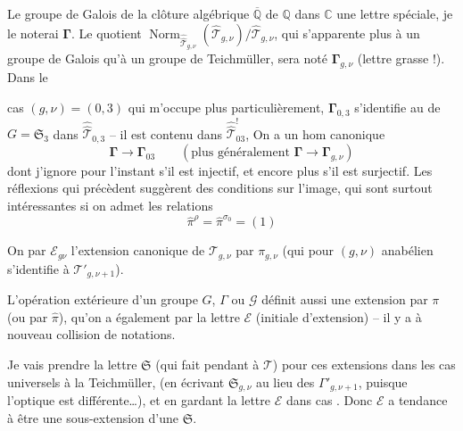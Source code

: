 Le groupe de Galois  de la clôture algébrique $\overline{\mathbb Q}$ de $\mathbb Q$ dans $\mathbb C$   une lettre spéciale, je le noterai $\boldsymbol{\Gamma}$. Le quotient  $\operatorname{Norm}_{\widehat{\widehat{\mathcal T}}_{g,\nu}}(\widehat{\mathcal T}_{g,\nu})/\widehat{\mathcal T}_{g,\nu}$, qui s'apparente plus à un groupe de Galois qu'à un groupe de Teichmüller, sera noté $\boldsymbol{\Gamma}_{g,\nu}$ (lettre grasse !). Dans le



cas $(g,\nu)=(0,3)$ qui m'occupe plus particulièrement, $\boldsymbol{\Gamma}_{0,3}$ s'identifie au   de $G=\mathfrak S_3$  dans $\widehat{\widehat{\mathcal T}}_{0,3}$ -- il est contenu dans $\widehat{\widehat{\mathcal T}}_{03}^{!}$,  On a un hom canonique
\[
\boldsymbol{\Gamma}\longrightarrow\boldsymbol{\Gamma}_{03}
\qquad (\text{plus généralement }\boldsymbol{\Gamma}\longrightarrow\boldsymbol{\Gamma}_{g,\nu})
\]
dont j'ignore pour l'instant s'il est injectif, et encore plus s'il est surjectif. Les réflexions qui précèdent suggèrent des conditions sur l'image, qui sont surtout intéressantes si on admet les relations
\[
\widehat{\pi}^{\rho}=\widehat{\pi}^{\sigma_0}=(1)
\]

On   par $\mathcal E_{g\nu}$ l'extension canonique de $\mathcal T_{g,\nu}$ par $\pi_{g,\nu}$ (qui pour $(g,\nu)$ anabélien s'identifie à $\mathcal T'_{g,\nu+1}$).

L'opération extérieure d'un groupe $G$, $\Gamma$ ou $\mathcal G$ définit aussi une extension par $\pi$ (ou par $\widehat{\pi}$), qu'on a également  par la lettre $\mathcal E$ (initiale d'extension) -- il y a à nouveau collision de notations.



Je vais prendre la lettre $\mathfrak{S}$ (qui fait pendant à $\mathcal{T}$) pour ces extensions dans les cas universels à la Teichmüller, (en écrivant $\mathfrak{S}_{g,\nu}$ au lieu des $\Gamma'_{g,\nu+1}$, puisque l'optique est différente\ldots), et en gardant la lettre $\mathcal{E}$ dans  cas . Donc $\mathcal{E}$ a tendance à être une sous-extension d'une $\mathfrak{S}$.

